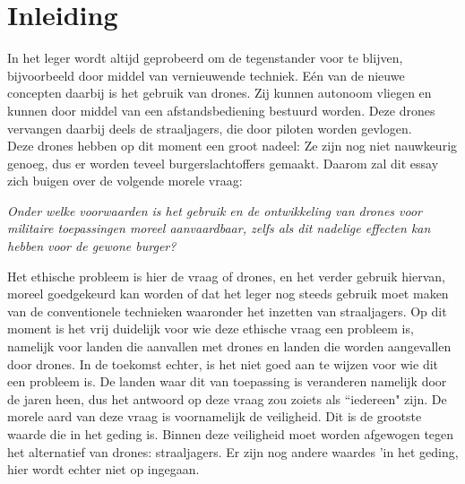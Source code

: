 \section{Inleiding}\subtitle{Timothy de Moor}
In het leger wordt altijd geprobeerd om de tegenstander voor te blijven, bijvoorbeeld door middel van vernieuwende techniek. E\'en van de nieuwe concepten daarbij is het gebruik van drones. Zij kunnen autonoom vliegen en kunnen door middel van een afstandsbediening bestuurd worden. Deze drones vervangen daarbij deels de straaljagers, die door piloten worden gevlogen.\\
Deze drones hebben op dit moment een groot nadeel: Ze zijn nog niet nauwkeurig genoeg, dus er worden teveel burgerslachtoffers gemaakt. Daarom zal dit essay zich buigen over de volgende morele vraag:

{\it{Onder welke voorwaarden is het gebruik en de ontwikkeling van drones voor militaire toepassingen moreel aanvaardbaar, zelfs als dit nadelige effecten kan hebben voor de gewone burger?}\vspace{5mm}}

Het ethische probleem is hier de vraag of drones, en het verder gebruik hiervan, moreel goedgekeurd kan worden of dat het leger nog steeds gebruik moet maken van de conventionele technieken waaronder het inzetten van straaljagers.
Op dit moment is het vrij duidelijk voor wie deze ethische vraag een probleem is, namelijk voor landen die aanvallen met drones en landen die worden aangevallen door drones. In de toekomst echter, is het niet goed aan te wijzen voor wie dit een probleem is. De landen waar dit van toepassing is veranderen namelijk door de jaren heen, dus het antwoord op deze vraag zou zoiets als ``iedereen" zijn.
De morele aard van deze vraag is voornamelijk de veiligheid. Dit is de grootste waarde die in het geding is. Binnen deze veiligheid moet worden afgewogen tegen het alternatief van drones: straaljagers. Er zijn nog andere waardes 'in het geding, hier wordt echter niet op ingegaan. 
